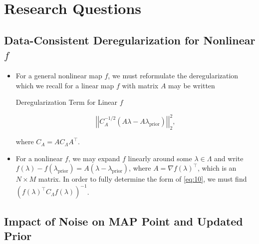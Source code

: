 \documentclass[11pt]{beamer}
\begin{document}
\section{Research Questions}


\subsection{Data-Consistent Deregularization for Nonlinear $f$}

\begin{frame}

\begin{itemize}
	
	\item For a general nonlinear map $f$, we must reformulate the deregularization which we recall for a linear map $f$ with matrix $A$ may be written

\begin{block}{Deregularization Term for Linear $f$}

\begin{equation} \label{eq:10}
\left|\left|C_A^{-1/2}(A\lambda-A\lambda_{\text{prior}})\right|\right|_2^2,
\end{equation} 

\noindent where $C_A=AC_\Lambda A^\top$. 

\end{block}

\item For a nonlinear $f$, we may expand $f$ linearly around some $\lambda \in \Lambda$ and write $f(\lambda)-f(\lambda_\text{prior})=A (\lambda-\lambda_\text{prior})$, where $A=\nabla f (\lambda)^\top$, which is an $N \times M$ matrix. In order to fully determine the form of \eqref{eq:10}, we must find $(f(\lambda)^\top C_\Lambda f(\lambda))^{-1}$.


\end{itemize}

\end{frame}

\subsection{Impact of Noise on MAP Point and Updated Prior}
\end{document}
